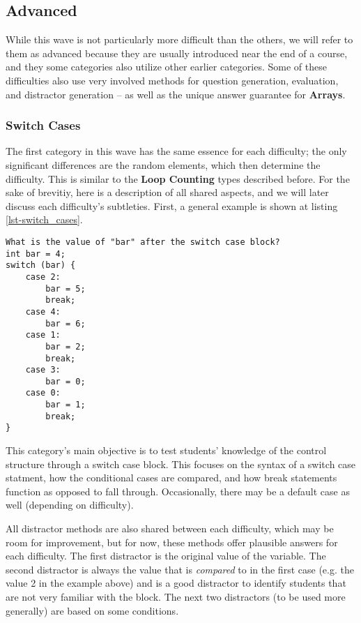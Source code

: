 \documentclass{article}
\begin{document}
\subsection{Advanced} \label{subsec-advanced}

While this wave is not particularly more difficult than the others, we will refer to them as advanced because they are usually introduced near the end of a course, and they some categories also 
utilize other earlier categories. Some of these difficulties also use very involved methods for question generation, evaluation, and distractor generation -- as well as the unique answer guarantee 
for \textbf{Arrays}. 

\subsubsection{Switch Cases} \label{subsubsec-switch_cases}
The first category in this wave has the same essence for each difficulty; the only significant differences are the random elements, which then determine the difficulty. This is similar to the \textbf{Loop 
Counting} types described before. For the sake of brevitiy, here is a description of all shared aspects, and we will later discuss each difficulty's subtleties. First, a general example is shown at listing \ref{lst-switch_cases}.

\begin{lstlisting}[caption={\textbf{Switch Cases} Example}, label=lst-switch_cases]
What is the value of "bar" after the switch case block?
int bar = 4; 
switch (bar) { 
	case 2: 
		bar = 5; 
		break; 
	case 4: 
		bar = 6; 
	case 1: 
		bar = 2;
		break; 
	case 3: 
		bar = 0; 
	case 0: 
		bar = 1; 
		break; 
} 
\end{lstlisting}


This category's main objective is to test students' knowledge of the control structure through a switch case block. This focuses on the syntax of a switch case statment, how
the conditional cases are compared, and how break statements function as opposed to fall through. Occasionally, there may be a default case as well (depending on difficulty). 

All distractor methods are also shared between each difficulty, which may be room for improvement, but for now, these methods offer plausible answers for each difficulty. The first distractor is
the original value of the variable. The second distractor is always the value that is \textit{compared} to in the first case (e.g. the value 2 in the example above) and is a good distractor to identify students that are not very familiar with the block. The next two distractors (to be used more generally) are based on some conditions. 
\end{document}
